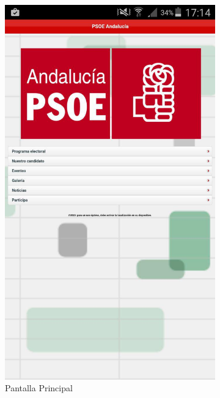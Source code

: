\begin{figure}[H]
        \centering
        \begin{subfigure}[b]{0.3\textwidth}
                \includegraphics[width=\textwidth]{Media/Captures/psoeAndalucia.jpg}
                \caption{Pantalla Principal}
                \label{fig:psoePpal}
        \end{subfigure}
        ~
        \begin{subfigure}[b]{0.3\textwidth}

\end{subfigure}
\end{figure}
